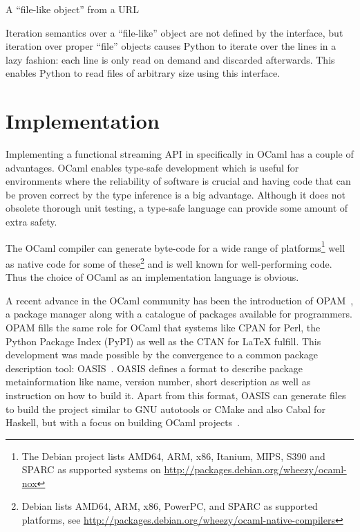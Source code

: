 \documentclass[parskip=half]{scrreprt}
\begin{document}
\begin{listing}[H]
  \inputminted[linenos]{python}{remote.py}
  \caption{A \enquote{file-like object} from a URL}
  \label{lst:pyremote}
\end{listing}

Iteration semantics over a \enquote{file-like} object are not defined by the
interface, but iteration over proper \enquote{file} objects causes Python to
iterate over the lines in a lazy fashion: each line is only read on demand and
discarded afterwards. This enables Python to read files of arbitrary size using
this interface.

\chapter{Implementation}
\label{sec:implementation}

Implementing a functional streaming API in specifically in OCaml has a couple
of advantages. OCaml enables type-safe development which is useful for
environments where the reliability of software is crucial and having code that
can be proven correct by the type inference is a big advantage. Although it
does not obsolete thorough unit testing, a type-safe language can provide some
amount of extra safety.

The OCaml compiler can generate byte-code for a wide range of
platforms\footnote{The Debian project lists AMD64, ARM, x86, Itanium, MIPS, S390
and SPARC as supported systems on
\url{http://packages.debian.org/wheezy/ocaml-nox}} well as native code for some
of these\footnote{Debian lists AMD64, ARM, x86, PowerPC, and SPARC as supported
platforms, see
\url{http://packages.debian.org/wheezy/ocaml-native-compilers}} and is well
known for well-performing code. Thus the choice of OCaml as an implementation
language is obvious.

A recent advance in the OCaml community has been the introduction of
OPAM~\cite{gazagnaire2013opam}, a package manager along with a catalogue of
packages available for programmers.  OPAM fills the same role for OCaml that
systems like CPAN for Perl, the Python Package Index (PyPI) as well as the CTAN
for \LaTeX{} fulfill. This development was made possible by the convergence to a
common package description tool: OASIS~\cite{legall2012oasis}. OASIS defines a
format to describe package metainformation like name, version number, short
description as well as instruction on how to build it.  Apart from this format,
OASIS can generate files to build the project similar to GNU autotools or CMake
and also Cabal for Haskell, but with a focus on building OCaml
projects~\cite{legall2011quickstart}.
\end{document}
